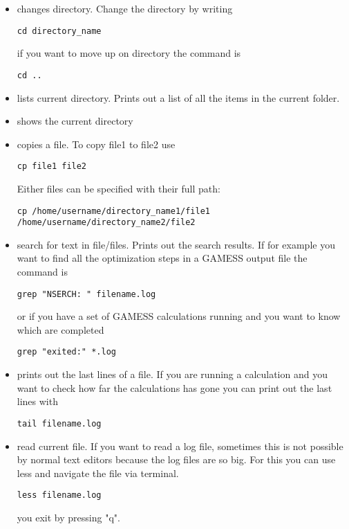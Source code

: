 \documentclass{article}
\begin{document}
\begin{itemize}

    \item {} changes directory. Change the directory by writing
\begin{lstlisting}
cd directory_name
\end{lstlisting}

        if you want to move up on directory the command is
\begin{lstlisting}
cd ..
\end{lstlisting}

    \item {} lists current directory. Prints out a list of all the items in the current folder.
    
    \item {} shows the current directory
    
    \item {} copies a file. To copy file1 to file2 use
\begin{lstlisting}
cp file1 file2
\end{lstlisting}
Either files can be specified with their full path:
\begin{lstlisting}
cp /home/username/directory_name1/file1 /home/username/directory_name2/file2
\end{lstlisting}

    \item {} search for text in file/files. Prints out the search results. If for example you want to find all the optimization steps in a GAMESS output file the command is
\begin{lstlisting}
grep "NSERCH: " filename.log
\end{lstlisting}
        or if you have a set of GAMESS calculations running and you want to know which are completed
\begin{lstlisting}
grep "exited:" *.log
\end{lstlisting}

    \item {} prints out the last lines of a file. 
        If you are running a calculation and you want to check how far the calculations has gone you can print out the last lines with
\begin{lstlisting}
tail filename.log
\end{lstlisting}

    \item {} read current file. If you want to read a log file, sometimes this is not possible by normal text editors because the log files are so big. For this you can use less and navigate the file via terminal.
\begin{lstlisting}
less filename.log
\end{lstlisting}
    you exit by pressing "q".


\end{itemize}
\end{document}
